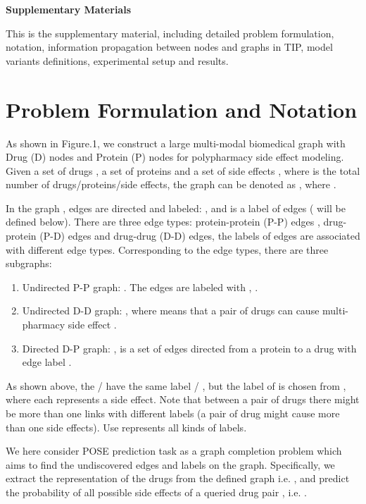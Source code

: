 \documentclass{article}
\begin{document}
\medskip
\small



\newpage
\textbf{\Large Supplementary Materials}

This is the supplementary material, including detailed problem formulation, notation, information propagation between nodes and graphs in TIP, model variants definitions, experimental setup and results.

\section{Problem Formulation and Notation}

As shown in Figure.1, we construct a large multi-modal biomedical graph with Drug (D) nodes and Protein (P) nodes for polypharmacy side effect modeling. Given a set of drugs , a set of proteins  and a set of side effects , where  is the total number of drugs/proteins/side effects, the graph can be denoted as , where .

In the graph , edges are directed and labeled: ,  and  is a label of edges ( will be defined below). There are three edge types: protein-protein (P-P) edges , drug-protein (P-D) edges and drug-drug (D-D) edges, the labels of edges are associated with different edge types. Corresponding to the edge types, there are three subgraphs:

\begin{enumerate}
	\item Undirected P-P graph: . The edges  are labeled with , .
	
	\item Undirected D-D graph: , where  means that a pair of drugs  can cause multi-pharmacy side effect .
	
	\item Directed D-P graph: ,  is a set of edges directed from a protein to a drug with edge label .
\end{enumerate}

As shown above, the / have the same label  / , but the label of  is chosen from , where each  represents a side effect. Note that between a pair of drugs there might be more than one links with different labels (a pair of drug might cause more than one side effects). Use  represents all kinds of labels.

We here consider POSE prediction task as a graph completion problem which aims to find the undiscovered edges and labels on the graph. Specifically, we extract the representation of the drugs from the defined graph  i.e. , and predict the probability of all possible side effects of a queried drug pair , i.e. . 
\end{document}
